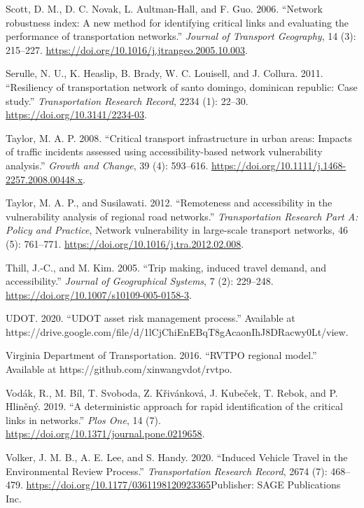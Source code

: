 \documentclass[]{ascelike-new}
\newlength{\cslhangindent}
\newenvironment{CSLReferences}[2] %
 {\begin{list}{}{%
  \setlength{\itemindent}{0pt}
  \setlength{\leftmargin}{0pt}
  \setlength{\parsep}{0pt}
  \ifodd #1
   \setlength{\leftmargin}{\cslhangindent}
   \setlength{\itemindent}{-1\cslhangindent}
  \fi
  \setlength{\itemsep}{#2\baselineskip}}}
 {\end{list}}
\begin{document}
\begin{CSLReferences}{1}{0}
Scott, D. M., D. C. Novak, L. Aultman-Hall, and F. Guo. 2006. {``Network
robustness index: A new method for identifying critical links and
evaluating the performance of transportation networks.''} \emph{Journal
of Transport Geography}, 14 (3): 215--227.
\url{https://doi.org/10.1016/j.jtrangeo.2005.10.003}.

Serulle, N. U., K. Heaslip, B. Brady, W. C. Louisell, and J. Collura.
2011. {``Resiliency of transportation network of santo domingo,
dominican republic: Case study.''} \emph{Transportation Research
Record}, 2234 (1): 22--30. \url{https://doi.org/10.3141/2234-03}.

Taylor, M. A. P. 2008. {``Critical transport infrastructure in urban
areas: Impacts of traffic incidents assessed using accessibility-based
network vulnerability analysis.''} \emph{Growth and Change}, 39 (4):
593--616. \url{https://doi.org/10.1111/j.1468-2257.2008.00448.x}.

Taylor, M. A. P., and Susilawati. 2012. {``Remoteness and accessibility
in the vulnerability analysis of regional road networks.''}
\emph{Transportation Research Part A: Policy and Practice}, Network
vulnerability in large-scale transport networks, 46 (5): 761--771.
\url{https://doi.org/10.1016/j.tra.2012.02.008}.

Thill, J.-C., and M. Kim. 2005. {``Trip making, induced travel demand,
and accessibility.''} \emph{Journal of Geographical Systems}, 7 (2):
229--248. \url{https://doi.org/10.1007/s10109-005-0158-3}.

UDOT. 2020. {``UDOT asset risk management process.''} Available at
https://drive.google.com/file/d/1lCjChiEnEBqT8gAcaonIhJ8DRacwy0Lt/view.

Virginia Department of Transportation. 2016. {``RVTPO regional model.''}
Available at https://github.com/xinwangvdot/rvtpo.

Vodák, R., M. Bíl, T. Svoboda, Z. Křivánková, J. Kubeček, T. Rebok, and
P. Hliněný. 2019. {``A deterministic approach for rapid identification
of the critical links in networks.''} \emph{Plos One}, 14 (7).
\url{https://doi.org/10.1371/journal.pone.0219658}.

Volker, J. M. B., A. E. Lee, and S. Handy. 2020. {``Induced Vehicle
Travel in the Environmental Review Process.''} \emph{Transportation
Research Record}, 2674 (7): 468--479.
\url{https://doi.org/10.1177/0361198120923365}Publisher: SAGE
Publications Inc.


\end{CSLReferences}
\end{document}
